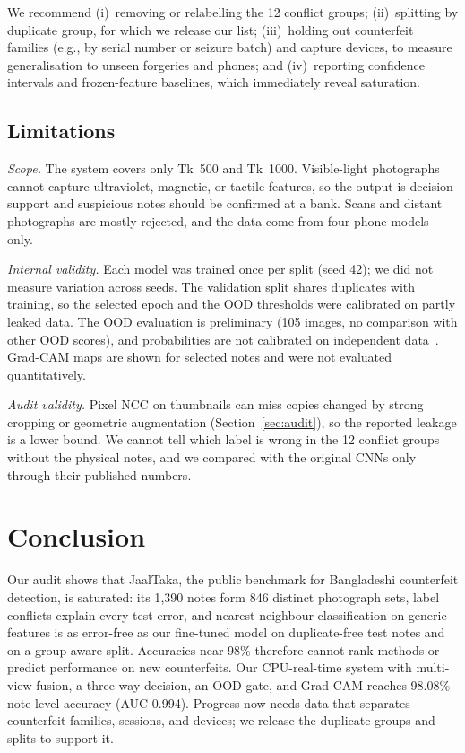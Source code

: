 \documentclass[pdflatex,iicol,sn-mathphys-num]{sn-jnl}
\begin{document}
We recommend (i)~removing or relabelling the 12 conflict groups; (ii)~splitting by
duplicate group, for which we release our list; (iii)~holding out counterfeit families
(e.g., by serial number or seizure batch) and capture devices, to measure generalisation
to unseen forgeries and phones; and (iv)~reporting confidence intervals and
frozen-feature baselines, which immediately reveal saturation.

\subsection{Limitations}\label{sec:limits}

\emph{Scope.} The system covers only Tk~500 and Tk~1000. Visible-light photographs
cannot capture ultraviolet, magnetic, or tactile features, so the output is decision
support and suspicious notes should be confirmed at a bank. Scans and distant
photographs are mostly rejected, and the data come from four phone models only.

\emph{Internal validity.} Each model was trained once per split (seed 42); we did not
measure variation across seeds. The validation split shares duplicates with training,
so the selected epoch and the OOD thresholds were calibrated on partly leaked data. The
OOD evaluation is preliminary (105 images, no comparison with other OOD scores), and
probabilities are not calibrated on independent data~\cite{guo2017calibration}.
Grad-CAM maps are shown for selected notes and were not evaluated quantitatively.

\emph{Audit validity.} Pixel NCC on thumbnails can miss copies changed by strong
cropping or geometric augmentation (Section~\ref{sec:audit}), so the reported leakage is
a lower bound. We cannot tell which label is wrong in the 12 conflict groups without the
physical notes, and we compared with the original CNNs only through their published
numbers.

\section{Conclusion}\label{sec:conclusion}

Our audit shows that JaalTaka, the public benchmark for Bangladeshi counterfeit
detection, is saturated: its 1{,}390 notes form 846 distinct photograph sets, label
conflicts explain every test error, and nearest-neighbour classification on generic
features is as error-free as our fine-tuned model on duplicate-free test notes and on a
group-aware split.
Accuracies near 98\% therefore cannot rank methods or predict performance on new
counterfeits. Our CPU-real-time system with multi-view fusion, a three-way decision, an
OOD gate, and Grad-CAM reaches 98.08\% note-level accuracy (AUC 0.994). Progress now
needs data that separates counterfeit families, sessions, and devices; we release the
duplicate groups and splits to support it.
\end{document}
